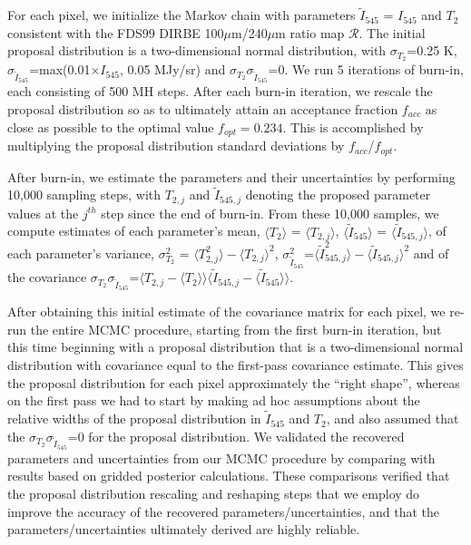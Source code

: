\documentclass{emulateapj}
\begin{document}
For each pixel, we initialize the Markov chain with parameters 
$\tilde{I}_{545}$ = $I_{545}$ and $T_2$ consistent with the FDS99 
DIRBE 100$\mu$m/240$\mu$m ratio map $\mathscr{R}$. The initial proposal 
distribution is a two-dimensional normal distribution, with 
$\sigma_{T_2}$=0.25 K, 
$\sigma_{\tilde{I}_{545}}$=max(0.01$\times$$I_{545}$, 0.05 MJy/sr) and
$\sigma_{T_2}\sigma_{\tilde{I}_{545}}$=0. We run 5 iterations of burn-in, each 
consisting of 500 MH steps. After each burn-in iteration, we rescale the 
proposal distribution so as to ultimately attain an acceptance fraction 
$f_{acc}$ as close as possible to the optimal value $f_{opt}=0.234$. This is 
accomplished by multiplying the proposal distribution standard deviations by 
$f_{acc}$/$f_{opt}$.

After burn-in, we estimate the parameters and their uncertainties by performing
10,000 sampling steps, with $T_{2, j}$ and $\tilde{I}_{545, j}$ denoting the 
proposed parameter values at the $j^{th}$ step since the end of burn-in. From 
these 10,000 samples, we compute estimates of each parameter's mean, 
$\langle T_2 \rangle$ = $\langle T_{2, j} \rangle$, 
$\langle \tilde{I}_{545} \rangle$ = $\langle \tilde{I}_{545, j} \rangle$, of 
each parameter's variance, 
$\sigma^2_{T_2}$ = $\langle T^2_{2, j} \rangle-\langle T_{2, j} \rangle ^2$, 
$\sigma^2_{\tilde{I}_{545}}$=$\langle \tilde{I}^2_{545, j} 
\rangle-\langle \tilde{I}_{545, j} \rangle ^2$ and of the covariance 
$\sigma_{T_2}\sigma_{\tilde{I}_{545}}$=$\langle T_{2,j}-\langle T_2 \rangle 
\rangle \langle \tilde{I}_{545, j} - \langle \tilde{I}_{545} \rangle \rangle$. 

After obtaining this initial estimate of the covariance matrix for each
pixel, we re-run the entire MCMC procedure, starting from the first burn-in 
iteration, but this time beginning with a proposal distribution that is a 
two-dimensional normal distribution with covariance equal to the first-pass
covariance estimate. This gives the proposal distribution for each pixel
 approximately the ``right shape'', whereas on the first pass we had to start
by making ad hoc assumptions about the relative widths of the proposal 
distribution in $\tilde{I}_{545}$ and $T_2$, and also assumed that the 
$\sigma_{T_2}\sigma_{\tilde{I}_{545}}$=0 for the proposal distribution. We
validated the recovered parameters and uncertainties from our MCMC procedure
by comparing with results based on gridded posterior calculations. These 
comparisons verified that the proposal distribution rescaling and reshaping 
steps that we employ do improve the accuracy of the recovered 
parameters/uncertainties, and that the parameters/uncertainties ultimately 
derived are highly reliable.
\end{document}

